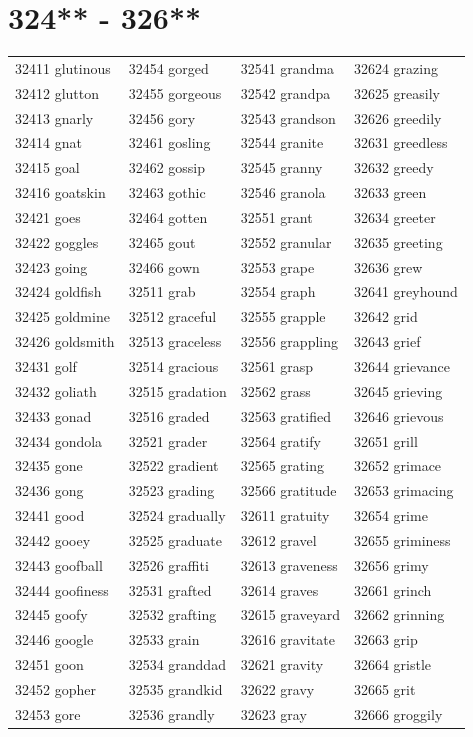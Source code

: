 \documentclass[10pt, oneside]{book}
\begin{document}
\begin{table}
	\centering
	\section*{324** - 326**}
	\begin{tabular}{l l l l}
32411 glutinous &32454 gorged &32541 grandma &32624 grazing\\
32412 glutton &32455 gorgeous &32542 grandpa &32625 greasily\\
32413 gnarly &32456 gory &32543 grandson &32626 greedily\\
32414 gnat &32461 gosling &32544 granite &32631 greedless\\
32415 goal &32462 gossip &32545 granny &32632 greedy\\
32416 goatskin &32463 gothic &32546 granola &32633 green\\
32421 goes &32464 gotten &32551 grant &32634 greeter\\
32422 goggles &32465 gout &32552 granular &32635 greeting\\
32423 going &32466 gown &32553 grape &32636 grew\\
32424 goldfish &32511 grab &32554 graph &32641 greyhound\\
32425 goldmine &32512 graceful &32555 grapple &32642 grid\\
32426 goldsmith &32513 graceless &32556 grappling &32643 grief\\
32431 golf &32514 gracious &32561 grasp &32644 grievance\\
32432 goliath &32515 gradation &32562 grass &32645 grieving\\
32433 gonad &32516 graded &32563 gratified &32646 grievous\\
32434 gondola &32521 grader &32564 gratify &32651 grill\\
32435 gone &32522 gradient &32565 grating &32652 grimace\\
32436 gong &32523 grading &32566 gratitude &32653 grimacing\\
32441 good &32524 gradually &32611 gratuity &32654 grime\\
32442 gooey &32525 graduate &32612 gravel &32655 griminess\\
32443 goofball &32526 graffiti &32613 graveness &32656 grimy\\
32444 goofiness &32531 grafted &32614 graves &32661 grinch\\
32445 goofy &32532 grafting &32615 graveyard &32662 grinning\\
32446 google &32533 grain &32616 gravitate &32663 grip\\
32451 goon &32534 granddad &32621 gravity &32664 gristle\\
32452 gopher &32535 grandkid &32622 gravy &32665 grit\\
32453 gore &32536 grandly &32623 gray &32666 groggily\\
	\end{tabular}
 \end{table}
\clearpage
\end{document}
